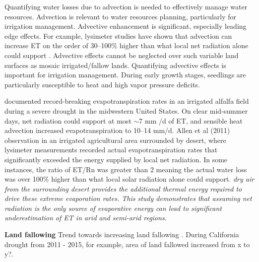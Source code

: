 \documentclass{article}
\begin{document}
    
    Quantifying water losses due to advection is needed to effectively manage water resources.
    Advection is relevant to water resources planning, particularly for irrigation management. 
    Advective enhancement is significant, especially leading edge effects.  For example, lysimeter studies have shown that advection can increase ET on the order of 30–100\%  higher than what local net radiation alone could support \cite{rijks1971water, rosenberg1978extreme, spronken2000advection}.
     Advective effects cannot be neglected over such variable land surfaces as mosaic irrigated/fallow lands.
    Quantifying advective effects is important for irrigation management.
    During early growth stages, seedlings are particularly susceptible to heat and high vapor pressure deficits.

    \citet{rosenberg1978extreme} documented record-breaking evapotranspiration rates in an irrigated alfalfa field during a severe drought in the midwestern United States.  On clear mid-summer days, net radiation  could support at most $\sim$7 mm /d of ET, and sensible heat advection increased evapotranspiration to 10–14 mm/d.
    Allen et al (2011) observation in an irrigated agricultural area surrounded by desert, where lysimeter measurements recorded actual evapotranspiration  rates that significantly exceeded the energy supplied by local net radiation. In some instances, the ratio of ET/Rn  was greater than 2 meaning the actual water loss was over 100\% higher than what local solar radiation alone could support. 
    \textit{dry air from the surrounding desert provides the additional thermal energy required to drive these extreme evaporation rates. This study demonstrates that assuming net radiation is the only source of evaporative energy can lead to significant underestimation of ET in arid and semi-arid regions.}


    
    \textbf{Land fallowing}
    Trend towards increasing land fallowing  \cite{melton2014mapping}.
    During California drought from 2011 - 2015, for example, area of land fallowed increased from x to y?. 
\end{document}

